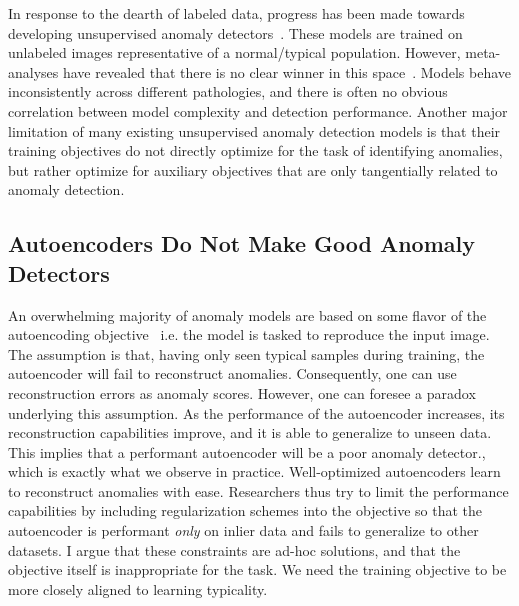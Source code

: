In response to the dearth of labeled data, progress has been made towards developing unsupervised anomaly detectors~\cite{bergmann2020uninformed,baur_deep_2019,ruff_unifying_2021}. These models are trained on unlabeled images representative of a normal/typical population.
However, meta-analyses have revealed that there is no clear winner in this space~\cite{baur2021,ruff_unifying_2021}. Models behave inconsistently across different pathologies, and there is often no obvious correlation between model complexity and detection performance.
Another major limitation of many existing unsupervised anomaly detection models is that their training objectives do not directly optimize for the task of identifying anomalies, but rather optimize for auxiliary objectives that are only tangentially related to anomaly detection.

\subsection*{Autoencoders Do Not Make Good Anomaly Detectors}
An overwhelming majority of anomaly models are based on some flavor of the autoencoding objective~\cite{baur_deep_2019,baur2021,tschuchnig_anomaly_2022,kascenas2023} i.e. the model is tasked to reproduce the input image. The assumption is that, having only seen typical samples during training, the autoencoder will fail to reconstruct anomalies. Consequently, one can use reconstruction errors as anomaly scores. However, one can foresee a paradox underlying this assumption. As the performance of the autoencoder increases, its reconstruction capabilities improve, and it is able to generalize to unseen data. This implies that a performant autoencoder will be a poor anomaly detector., which is exactly what we observe in practice. Well-optimized autoencoders learn to reconstruct anomalies with ease. Researchers thus try to limit the performance capabilities by including regularization schemes into the objective so that the autoencoder is performant \textit{only} on inlier data and fails to generalize to other datasets. I argue that these constraints are ad-hoc solutions, and that the objective itself is inappropriate for the task. We need the training objective to be more closely aligned to learning typicality. 

